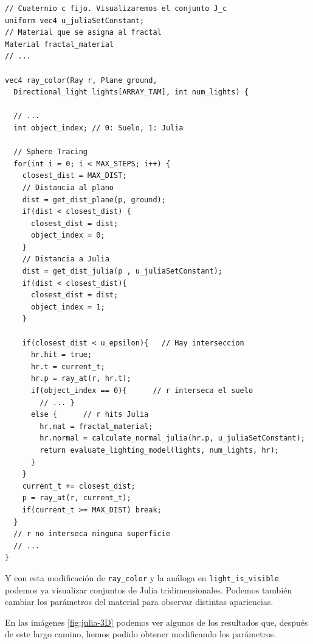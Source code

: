 \begin{lstlisting}
// Cuaternio c fijo. Visualizaremos el conjunto J_c
uniform vec4 u_juliaSetConstant;
// Material que se asigna al fractal
Material fractal_material
// ...

vec4 ray_color(Ray r, Plane ground, 
  Directional_light lights[ARRAY_TAM], int num_lights) {

  // ... 
  int object_index; // 0: Suelo, 1: Julia

  // Sphere Tracing
  for(int i = 0; i < MAX_STEPS; i++) {
    closest_dist = MAX_DIST;
    // Distancia al plano
    dist = get_dist_plane(p, ground);
    if(dist < closest_dist) {
      closest_dist = dist;
      object_index = 0;
    }
    // Distancia a Julia
    dist = get_dist_julia(p , u_juliaSetConstant);
    if(dist < closest_dist){
      closest_dist = dist;
      object_index = 1;
    }

    if(closest_dist < u_epsilon){   // Hay interseccion
      hr.hit = true;
      hr.t = current_t;
      hr.p = ray_at(r, hr.t);
      if(object_index == 0){      // r interseca el suelo
        // ... }
      else {      // r hits Julia
        hr.mat = fractal_material;
        hr.normal = calculate_normal_julia(hr.p, u_juliaSetConstant);
        return evaluate_lighting_model(lights, num_lights, hr);
      }
    }
    current_t += closest_dist;
    p = ray_at(r, current_t);
    if(current_t >= MAX_DIST) break;
  }
  // r no interseca ninguna superficie
  // ... 
}
\end{lstlisting}

Y con esta modificación de \verb|ray_color| y la análoga en \verb|light_is_visible| podemos ya visualizar conjuntos de Julia tridimensionales. Podemos también cambiar los parámetros del material para observar distintas apariencias. 

En las imágenes \ref{fig:julia-3D} podemos ver algunos de los resultados que, después de este largo camino, hemos podido obtener modificando los parámetros.

